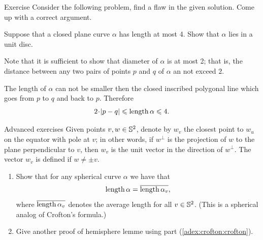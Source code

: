 \begin{thm}{Exercise}\label{ex:flaw}
Consider the following problem, find a flaw in the given solution.
Come up with a correct argument.
\end{thm}

 
Suppose that a closed plane curve $\alpha$ has length at most 4.
Show that $\alpha$ lies in a unit disc.

Note that it is sufficient to show that diameter of $\alpha$ is at most 2;
that is, the distance between any two pairs of points $p$ and $q$ of $\alpha$ an not exceed $2$.

The length of $\alpha$ can not be smaller then the closed inscribed polygonal line which goes from $p$ to $q$ and back to $p$.
Therefore 
\[2\cdot |p-q|\le\length \alpha\le 4.\]
\qedsf

\begin{thm}{Advanced exercises} \label{adex:crofton}
Given points $v,w\in\mathbb{S}^2$, denote by $w_v$ the closest point to $w_u$ on the equator with pole at $v$;
in other words, if $w^\perp$ is the projection of $w$ to the plane perpendicular to $v$, then $w_v$ is the unit vector in the direction of $w^\perp$.
The vector $w_v$ is defined if $w\ne\pm v$.

\begin{enumerate}
\item \label{adex:crofton:crofton}
Show that for any spherical curve $\alpha$ we have that
\[\mathop{\rm length}\nolimits\alpha=\overline{\mathop{\rm length}\nolimits\alpha_v},\]
where $\overline{\mathop{\rm length}\nolimits\alpha_v}$ denotes the average length for all $v\in \mathbb{S}^2$.
(This is a spherical analog of Crofton's formula.)
\item\label{adex:crofton:hemisphere} Give another proof of hemisphere lemme using part (\ref{adex:crofton:crofton}). 
\end{enumerate}
 
\end{thm}

